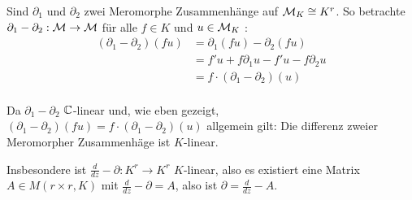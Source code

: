 Sind $\partial_1$ und $\partial_2$ zwei Meromorphe Zusammenhänge auf $\mathcal{M}_K\cong
K^r$. So betrachte $\partial_1-\partial_2:\mathcal{M}\rightarrow\mathcal{M}$ für alle $f\in K$ 
und $u\in \mathcal{M}_K$ :
\begin{align*}
  (\partial_1-\partial_2)(fu) &= \partial_1(fu)-\partial_2(fu)\\
  &= f'u+f\partial_1u-f'u-f\partial_2u\\
  &= f\cdot(\partial_1-\partial_2)(u)\\
\end{align*}
\begin{lem}
  Da $\partial_1-\partial_2$ $\mathbb{C}$-linear und, wie eben gezeigt,
  $(\partial_1-\partial_2)(fu)=f\cdot(\partial_1-\partial_2)(u)$ allgemein
  gilt: Die differenz zweier Meromorpher Zusammenhäge ist $K$-linear.
\end{lem}
Insbesondere ist $\frac{d}{dz}-\partial:K^r\rightarrow K^r$ $K$-linear, also es
existiert eine Matrix $A\in M(r\times r,K)$ mit $\frac{d}{dz}-\partial=A$, also
ist $\partial=\frac{d}{dz}-A$.



